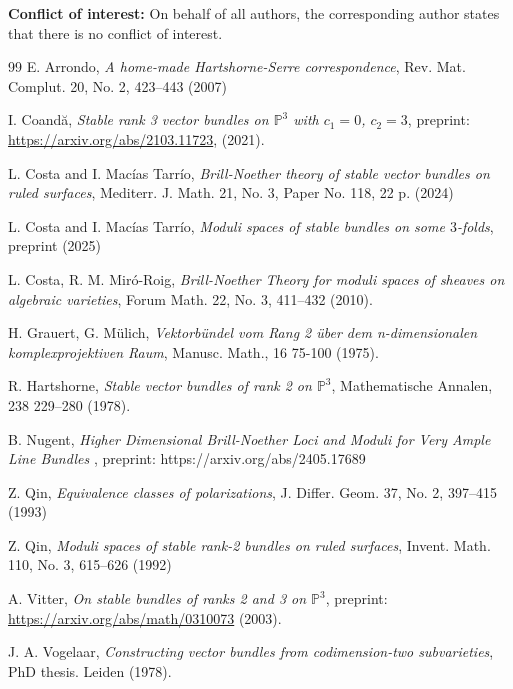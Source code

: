 \documentclass[11pt,twoside]{amsart}
\theoremstyle{definition}
\begin{document}
\vspace{3mm}
\noindent
{\bf Conflict of interest:} On behalf of all authors, the corresponding author states that there is no conflict of interest.


\begin{thebibliography}{99}
 E. Arrondo, \textit{A home-made Hartshorne-Serre correspondence},  Rev. Mat. Complut. 20, No. 2, 423--443 (2007)


I. Coandă,
\textit{Stable rank 3 vector bundles on \(\mathbb{P}^3\) with \(c_1 = 0\), \(c_2 = 3\)}, preprint: \url{https://arxiv.org/abs/2103.11723}, (2021).

L. Costa and I. Macías Tarrío, \textit{Brill-Noether theory of stable vector bundles on ruled surfaces}, Mediterr. J. Math. 21, No. 3, Paper No. 118, 22 p. (2024)

L. Costa and I. Macías Tarrío, \textit{Moduli spaces of stable bundles on some $3$-folds}, preprint (2025)

L. Costa, R. M. Miró-Roig, \textit{Brill-Noether Theory for moduli spaces of sheaves on algebraic varieties}, Forum Math. 22, No. 3, 411--432 (2010).

 H. Grauert, G. Mülich, \textit{Vektorbündel vom Rang 2 über dem n-dimensionalen komplexprojektiven Raum}, Manusc. Math., 16 75-100 (1975). 

R. Hartshorne,
\textit{Stable vector bundles of rank 2 on $\mathbb{P}^3$}, Mathematische Annalen, 238 229--280 (1978).

 B. Nugent, \textit{Higher Dimensional Brill-Noether Loci and Moduli for Very Ample Line Bundles
}, preprint: https://arxiv.org/abs/2405.17689

Z. Qin, \textit{Equivalence classes of polarizations}, J. Differ. Geom. 37, No. 2, 397--415 (1993)

Z. Qin, \textit{Moduli spaces of stable rank-2 bundles on ruled surfaces}, Invent. Math. 110, No. 3, 615--626 (1992)

A. Vitter,
\textit{On stable bundles of ranks 2 and 3 on $\mathbb{P}^3$}, preprint:
\url{https://arxiv.org/abs/math/0310073} (2003).

 J. A. Vogelaar, \textit{Constructing vector bundles from codimension-two subvarieties}, PhD
thesis. Leiden (1978).


\end{thebibliography}
\end{document}
